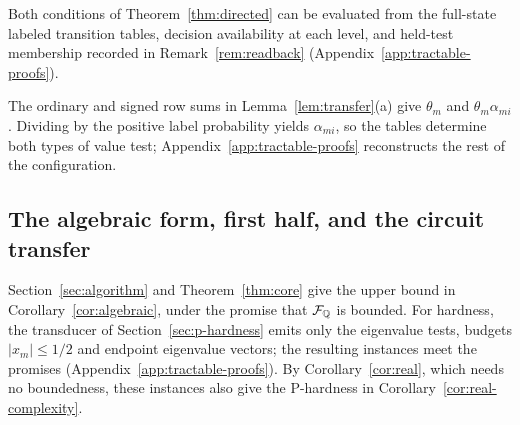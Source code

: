 Both conditions of Theorem~\ref{thm:directed} can be evaluated from the
full-state labeled transition tables, decision availability at each level,
and held-test membership recorded in Remark~\ref{rem:readback}
(Appendix~\ref{app:tractable-proofs}).

The ordinary and signed row sums in Lemma~\ref{lem:transfer}(a) give $\theta_m$ and $\theta_m\alpha_{mi}$. Dividing by the positive label probability yields $\alpha_{mi}$, so the tables determine both types of value test; Appendix~\ref{app:tractable-proofs}
reconstructs the rest of the configuration.

\subsection{The algebraic form, first half, and the circuit transfer}\label{sec:circuit-transfer}

Section~\ref{sec:algorithm} and Theorem~\ref{thm:core} give the upper
bound in Corollary~\ref{cor:algebraic}, under the promise that $\mathcal F_{\mathbb{Q}}$ is
bounded. For hardness, the transducer of Section~\ref{sec:p-hardness} emits
only the eigenvalue tests, budgets $|x_m|\le1/2$ and endpoint
eigenvalue vectors; the resulting instances meet the promises
(Appendix~\ref{app:tractable-proofs}). By Corollary~\ref{cor:real}, which
needs no boundedness, these instances also give the P-hardness in
Corollary~\ref{cor:real-complexity}.
